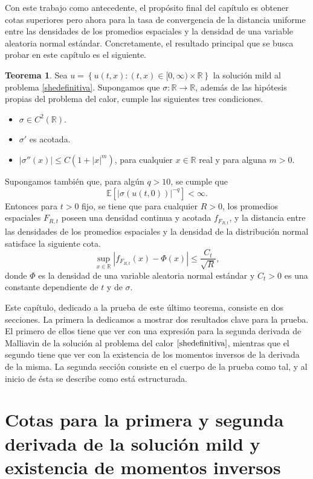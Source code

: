 \documentclass[letterpaper,twoside,12pt]{book}
\newcommand{\R}{\mathbb{R}}
\newcommand{\E}{\mathbb{E}}
\newcommand{\1}{\mathds{1}}
\newcommand{\abs}[1]{\left\lvert #1 \right\rvert}
\renewcommand{\to}{\rightarrow}
\theoremstyle{definition}
\theoremstyle{definition}
\newtheorem{teo}{Teorema}
\theoremstyle{remark}
\theoremstyle{definition}
\theoremstyle{definition}
\theoremstyle{definition}
\theoremstyle{definition}
\theoremstyle{definition}
\begin{document}
Con este trabajo como antecedente, el propósito final del capítulo es obtener cotas superiores pero ahora para la tasa de convergencia de la distancia uniforme entre las densidades de los promedios espaciales y la densidad de una variable aleatoria normal estándar. Concretamente, el resultado principal que se busca probar en este capítulo es el siguiente.
\begin{teo}\label{teoremaprincipal}
Sea $u=\left\{u(t,x):(t,x)\in [0,\infty)\times\R\right\}$ la solución mild al problema \eqref{shedefinitiva}. Supongamos que $\sigma:\R\to\R$, además de las hipótesis propias del problema del calor, cumple las siguientes tres condiciones.
\begin{itemize}
   \item $\sigma\in C^2(\R)$.
   \item $\sigma'$ es acotada.
   \item $\abs{\sigma''(x)}\leq C(1+\abs{x}^{m})$, \qquad para cualquier $x\in \R$ real y para alguna $m>0$.
\end{itemize}
Supongamos también que, para algún $q>10$, se cumple que 
\[
\E\left[\abs{\sigma(u(t,0))}^{-q}\right]<\infty.    
\]
Entonces para $t>0$ fijo, se tiene que para cualquier $R>0$, los promedios espaciales $F_{R,t}$ poseen una densidad continua y acotada $f_{F_{R,t}}$, y la distancia entre las densidades de los promedios espaciales y la densidad de la distribución normal satisface la siguiente cota.  
\[
\sup_{x\in \R} \abs{f_{F_{R,t}}(x)-\Phi(x)}\leq \frac{C_t}{\sqrt{R}},   
\]
donde $\Phi$ es la densidad de una variable aleatoria normal estándar y $C_t>0$ es una constante dependiente de $t$ y de $\sigma$.
\end{teo}

Este capítulo, dedicado a la prueba de este último teorema, consiste en dos secciones. La primera la dedicamos a mostrar dos resultados clave para la prueba. El primero de ellos tiene que ver con una expresión para la segunda derivada de Malliavin de la solución al problema del calor $\eqref{shedefinitiva}$, mientras que el segundo tiene que ver con la existencia de los momentos inversos de la derivada de la misma. La segunda sección consiste en el cuerpo de la prueba como tal, y al inicio de ésta se describe como está estructurada.

\section{Cotas para la primera y segunda derivada de la solución mild y existencia de momentos inversos}
\end{document}
